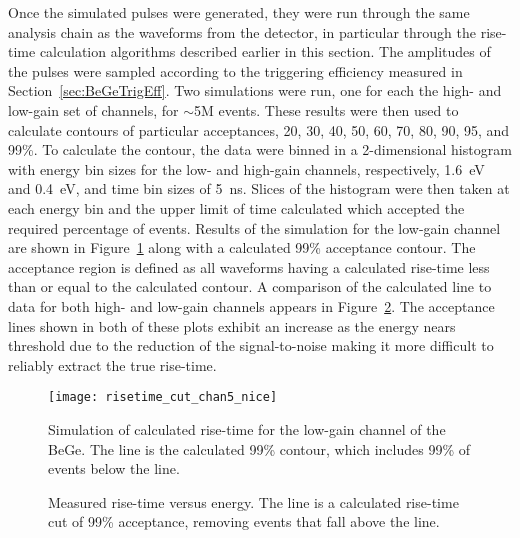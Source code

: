 	Once the simulated pulses were generated, they were run through the same analysis chain as the waveforms from the detector, in particular through the rise-time calculation algorithms described earlier in this section.  The amplitudes of the pulses were sampled according to the triggering efficiency measured in Section~\ref{sec:BeGeTrigEff}.  Two simulations were run, one for each the high- and low-gain set of channels, for $\sim$5M events.  These results were then used to calculate contours of particular acceptances, 20, 30, 40, 50, 60, 70, 80, 90, 95, and 99\%.  To calculate the contour, the data were binned in a 2-dimensional histogram with energy bin sizes for the low- and high-gain channels, respectively, 1.6~eV and 0.4~eV, and time bin sizes of 5~ns.  Slices of the histogram were then taken at each energy bin and the upper limit of time calculated which accepted the required percentage of events.  Results of the simulation for the low-gain channel are shown in Figure~\ref{fig:RisetimeSimulation} along with a calculated 99\% acceptance contour.  The acceptance region is defined as all waveforms having a calculated rise-time less than or equal to the calculated contour.  A comparison of the calculated line to data for both high- and low-gain channels appears in Figure~\ref{fig:RisetimeDataVsCut}.  The acceptance lines shown in both of these plots exhibit an increase as the energy nears threshold due to the reduction of the signal-to-noise making it more difficult to reliably extract the true rise-time.
					
				\begin{figure}
					\centering
					\texttt{[image: risetime\_cut\_chan5\_nice]}
					\caption[Simulation of calculated rise-time for the low-gain channel of the BeGe]
					{Simulation of calculated rise-time for the low-gain channel of the BeGe.  
					The line is the calculated 99\% contour, which includes 99\% of events below the line.}
					\label{fig:RisetimeSimulation}
				\end{figure}	
	
				\begin{figure}
					\centering
					\def\plotwidth{0.8\textwidth}					
					\caption[Measured rise-time versus energy with a calculated rise-time cut of 99\% acceptance]
					{Measured rise-time versus energy.  The line is a calculated rise-time cut of 99\% acceptance, 
					removing events that fall above the line.}
					\label{fig:RisetimeDataVsCut}
				\end{figure}	
	
